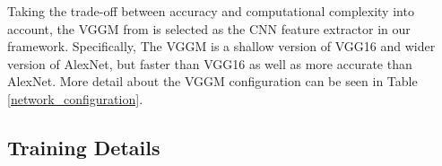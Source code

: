 \documentclass[journal]{IEEEtran}
\begin{document}
Taking the trade-off between accuracy and computational complexity into account, the VGGM from \cite{Chatfield2014} is selected as the CNN feature extractor in our framework. Specifically, The VGGM is a shallow version of VGG16 \cite{Simonyan2015VERYRECOGNITION} and wider version of AlexNet\cite{Krizhevsky2012ImageNetNetworks}, but faster than VGG16 as well as more accurate than AlexNet. More detail about the VGGM configuration can be seen in Table \ref{network_configuration}.
\begin{table*}[tp]
\caption{Network configuration: The complete network architecture contains two modules, first module is called \textit{CNN feature extractor} which includes 5 convolutional layers (conv 1-5), second module is the \textit{ROI classification and regression} which has an ROI pooling layer and 4 fully connected layers. }
\centering
{}

\label{network_configuration}
\end{table*}

\subsection{Training Details}
\end{document}
